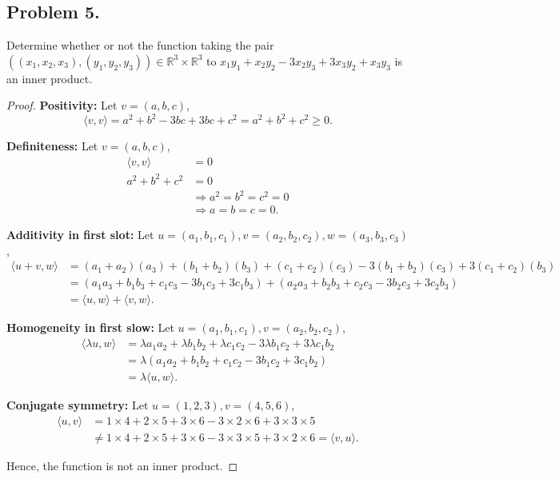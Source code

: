 \documentclass{article}
\renewcommand*{\implies}{\ensuremath{\Longrightarrow}}
\newcommand*{\R}{\ensuremath{\mathbb{R}}}
\begin{document}
\subsection*{Problem 5.}
Determine whether or not the function taking the pair $((x_1,x_2,x_3),(y_1,y_2,y_3)) \in \R^3 
\times \R^3$ to $x_1y_1+x_2y_2-3x_2y_3+3x_3y_2+x_3y_3$ is an inner product. 
\begin{proof}
    \textbf{Positivity:} Let $v = (a,b,c)$, 
    $$\langle v,v\rangle = a^2+b^2 - 3bc + 3bc + c^2 = a^2 + b^2 + c^2 \ge 0.$$

    \textbf{Definiteness:} Let $v= (a,b,c)$,
    \begin{align*}
        \langle v,v\rangle & = 0 \\
        a^2+b^2+c^2 & = 0 \\
        & \implies a^2 = b^2 = c^2 = 0 \\
        & \implies a = b = c = 0.
    \end{align*}

    \textbf{Additivity in first slot:} Let $u=(a_1,b_1,c_1), v=(a_2,b_2,c_2), w=(a_3,b_3,c_3)$,
    \begin{align*}
        \langle u+v, w\rangle & = (a_1+a_2)(a_3) + (b_1+b_2)(b_3) + (c_1+c_2)(c_3) - 3(b_1+b_2)(c_3) + 3(c_1+c_2)(b_3) \\
        & = (a_1a_3 + b_1b_3 + c_1c_3 - 3b_1c_3 + 3c_1b_3) + (a_2a_3 + b_2b_3 + c_2c_3 - 3b_2c_3 + 3c_2b_3) \\
        & = \langle u,w\rangle + \langle v,w\rangle.
    \end{align*}

    \textbf{Homogeneity in first slow:} Let $u=(a_1,b_1,c_1), v=(a_2,b_2,c_2)$,
    \begin{align*}
        \langle \lambda u, w\rangle & = \lambda a_1a_2 + \lambda b_1b_2 + \lambda c_1c_2 - 3\lambda b_1c_2 + 3\lambda c_1b_2 \\
        & = \lambda (a_1a_2 +  b_1b_2 +  c_1c_2 - 3 b_1c_2 + 3 c_1b_2) \\
        & = \lambda \langle u,w\rangle.
    \end{align*}

    \textbf{Conjugate symmetry:} Let $u=(1,2,3), v=(4,5,6)$,
    \begin{align*}
        \langle u,v\rangle & = 1\times 4 + 2\times 5 + 3\times 6 - 3\times 2\times 6 + 3\times 3\times 5 \\
        & \neq 1\times 4 + 2\times 5 + 3\times 6 - 3\times 3\times 5 + 3\times 2\times 6 = \langle v, u\rangle.
    \end{align*}

    Hence, the function is not an inner product.
\end{proof}
\end{document}
